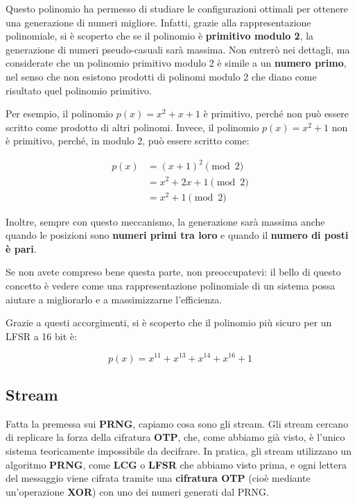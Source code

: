 \documentclass{rapport}
\begin{document}
Questo polinomio ha permesso di studiare le configurazioni ottimali per ottenere una generazione di numeri migliore.  
Infatti, grazie alla rappresentazione polinomiale, si è scoperto che se il polinomio è \textbf{primitivo modulo 2}, la generazione di numeri pseudo-casuali sarà massima.  
Non entrerò nei dettagli, ma considerate che un polinomio primitivo modulo 2 è simile a un \textbf{numero primo}, nel senso che non esistono prodotti di polinomi modulo 2 che diano come risultato quel polinomio primitivo.


Per esempio, il polinomio $p(x) = x^2 + x + 1$ è primitivo, perché non può essere scritto come prodotto di altri polinomi.  
Invece, il polinomio $p(x) = x^2 + 1$ non è primitivo, perché, in modulo 2, può essere scritto come:


\begin{align*}
    p(x) &= (x+1)^2 \pmod{2} \\ 
         &= x^2 + 2x +1 \pmod{2} \\
         &= x^2 +1 \pmod{2}
\end{align*}

Inoltre, sempre con questo meccanismo, la generazione sarà massima anche quando le posizioni sono \textbf{numeri primi tra loro} e quando il \textbf{numero di posti è pari}.


Se non avete compreso bene questa parte, non preoccupatevi: il bello di questo concetto è vedere come una rappresentazione polinomiale di un sistema possa aiutare a migliorarlo e a massimizzarne l'efficienza.


Grazie a questi accorgimenti, si è scoperto che il polinomio più sicuro per un LFSR a 16 bit è:

\begin{equation*}
    p(x) = x^{11} +x^{13} + x^{14} + x^{16} +1
\end{equation*}

\newpage

\subsection{Stream} 

Fatta la premessa sui \textbf{PRNG}, capiamo cosa sono gli stream.  
Gli stream cercano di replicare la forza della cifratura \textbf{OTP}, che, come abbiamo già visto, è l'unico sistema teoricamente impossibile da decifrare.  
In pratica, gli stream utilizzano un algoritmo \textbf{PRNG}, come \textbf{LCG} o \textbf{LFSR} che abbiamo visto prima, e ogni lettera del messaggio viene cifrata tramite una \textbf{cifratura OTP} (cioè mediante un'operazione \textbf{XOR}) con uno dei numeri generati dal PRNG.
\end{document}
